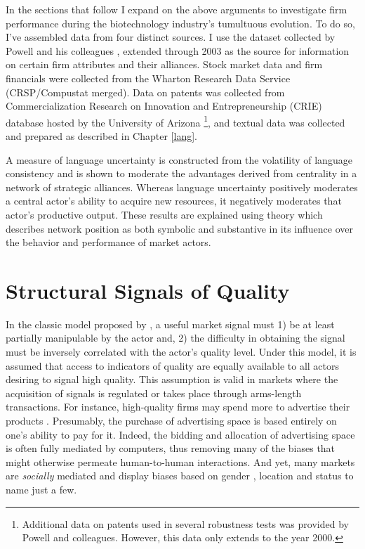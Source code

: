 In the sections that follow I expand on the above arguments to investigate firm performance during the biotechnology industry's tumultuous evolution. To do so, I've assembled data from four distinct sources. I use the dataset collected by Powell and his colleagues \citep[see][]{powell2005, powell1996}, extended through 2003 as the source for information on certain firm attributes and their alliances. Stock market data and firm financials were collected from the Wharton Research Data Service (CRSP/Compustat merged). Data on patents was collected from Commercialization Research on Innovation and Entrepreneurship (CRIE) database hosted by the University of Arizona \footnote{Additional data on patents used in several robustness tests was provided by Powell and colleagues. However, this data only extends to the year 2000.}, and textual data was collected and prepared as described in Chapter \ref{lang}. 

A measure of language uncertainty is constructed from the volatility of language consistency and is shown to moderate the advantages derived from centrality in a network of strategic alliances. Whereas language uncertainty positively moderates a central actor's ability to acquire new resources, it negatively moderates that actor's productive output. These results are explained using theory which describes network position as both symbolic and substantive in its influence over the behavior and performance of market actors.

\section{Structural Signals of Quality \label{sig_qual}}

In the classic model proposed by \citet{spence1973}, a useful market signal must 1) be at least partially manipulable by the actor and, 2) the difficulty in obtaining the signal must be inversely correlated with the actor's quality level. Under this model, it is assumed that access to indicators of quality are equally available to all actors desiring to signal high quality. This assumption is valid in markets where the acquisition of signals is regulated or takes place through arms-length transactions. For instance, high-quality firms may spend more to advertise their products \citep{kirmani2001}. Presumably, the purchase of advertising space is based entirely on one's ability to pay for it. Indeed, the bidding and allocation of advertising space is often fully mediated by computers, thus removing many of the biases that might otherwise permeate human-to-human interactions. And yet, many markets are \emph{socially} mediated and display biases based on gender \citep{koput2010}, location \citep{owen2004} and status \citep{kim2014} to name just a few. 

